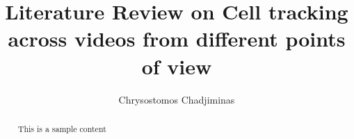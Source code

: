 \documentclass[]{article}
\title{Literature Review on Cell tracking across videos from different points of view}
\author{Chrysostomos Chadjiminas}
\begin{document}
\maketitle

\begin{abstract}
	This is a sample content
\end{abstract}


\section{}
             
\end{document}

